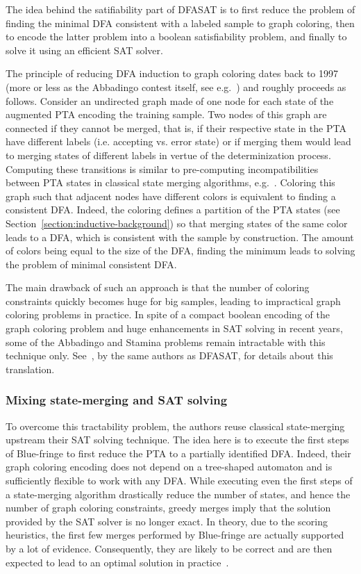 The idea behind the satifiability part of DFASAT is to first reduce the problem of finding the minimal DFA consistent with a labeled sample to graph coloring, then to encode the latter problem into a boolean satisfiability problem, and finally to solve it using an efficient SAT solver. 

The principle of reducing DFA induction to graph coloring dates back to 1997 (more or less as the Abbadingo contest itself, see e.g.~\cite{Coste:1997}) and roughly proceeds as follows. Consider an undirected graph made of one node for each state of the augmented PTA encoding the training sample. Two nodes of this graph are connected if they cannot be merged, that is, if their respective state in the PTA have different labels (i.e. accepting vs. error state) or if merging them would lead to merging states of different labels in vertue of the determinization process. Computing these transitions is similar to pre-computing incompatibilities between PTA states in classical state merging algorithms, e.g.~\cite{Coste:1998, Coste:2004}. Coloring this graph such that adjacent nodes have different colors is equivalent to finding a consistent DFA. Indeed, the coloring defines a partition of the PTA states (see Section~\ref{section:inductive-background}) so that merging states of the same color leads to a DFA, which is consistent with the sample by construction. The amount of colors being equal to the size of the DFA, finding the minimum leads to solving the problem of minimal consistent DFA.

The main drawback of such an approach is that the number of coloring constraints quickly becomes huge for big samples, leading to impractical graph coloring problems in practice. In spite of a compact boolean encoding of the graph coloring problem and huge enhancements in SAT solving in recent years, some of the Abbadingo and Stamina problems remain intractable with this technique only. See~\cite{Heule:2010}, by the same authors as DFASAT, for details about this translation.

\subsubsection*{Mixing state-merging and SAT solving}

To overcome this tractability problem, the authors reuse classical state-merging upstream their SAT solving technique. The idea here is to execute the first steps of Blue-fringe to first reduce the PTA to a partially identified DFA. Indeed, their graph coloring encoding does not depend on a tree-shaped automaton and is sufficiently flexible to work with any DFA. While executing even the first steps of a state-merging algorithm drastically reduce the number of states, and hence the number of graph coloring constraints, greedy merges imply that the solution provided by the SAT solver is no longer exact. In theory, due to the scoring heuristics, the first few merges performed by Blue-fringe are actually supported by a lot of evidence. Consequently, they are likely to be correct and are then expected to lead to an optimal solution in practice~\cite{Heule:2010}.

